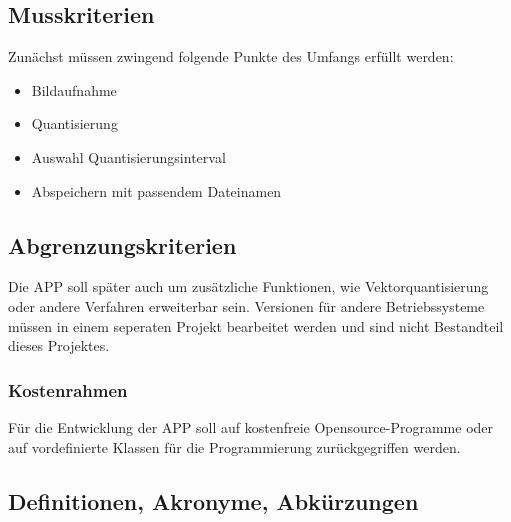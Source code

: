 \subsection{\textbf{Musskriterien}}

Zunächst müssen zwingend folgende Punkte des Umfangs erfüllt werden:

\begin{itemize}
   	\item Bildaufnahme
   	\item Quantisierung
   	\item Auswahl Quantisierungsinterval
   	\item Abspeichern mit passendem Dateinamen 
\end{itemize}

\subsection{\textbf{Abgrenzungskriterien}}

Die \acs{APP} soll später auch um zusätzliche Funktionen, wie Vektorquantisierung oder andere Verfahren erweiterbar sein. Versionen für andere Betriebssysteme müssen in einem seperaten Projekt bearbeitet werden und sind nicht Bestandteil dieses Projektes.			

\subsubsection{Kostenrahmen}

Für die Entwicklung der \acs{APP} soll auf kostenfreie Opensource-Programme oder auf vordefinierte Klassen für die Programmierung zurückgegriffen werden.


\subsection{\textbf{Definitionen, Akronyme, Abkürzungen}}
\begin{acronym}[UV-Licht]


\end{acronym}

